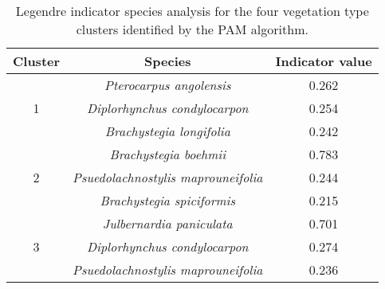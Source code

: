\begin{table}[h]
\centering
\begin{tabular}{ccc}
  \hline
Cluster & Species & Indicator value \\ 
  \hline
\multirow{3}{*}{1} & \textit{Pterocarpus angolensis} & 0.262 \\ 
& \textit{Diplorhynchus condylocarpon} & 0.254 \\ 
& \textit{Brachystegia longifolia} & 0.242 \\ 
   \hline
\multirow{3}{*}{2} & \textit{Brachystegia boehmii} & 0.783 \\ 
& \textit{Psuedolachnostylis maprouneifolia} & 0.244 \\ 
& \textit{Brachystegia spiciformis} & 0.215 \\ 
   \hline
\multirow{3}{*}{3} & \textit{Julbernardia paniculata} & 0.701 \\ 
& \textit{Diplorhynchus condylocarpon} & 0.274 \\ 
& \textit{Psuedolachnostylis maprouneifolia} & 0.236 \\ 
  \end{tabular}
\caption{Legendre indicator species analysis for the four vegetation type clusters identified by the PAM algorithm.} 
\label{indval}
\end{table}

